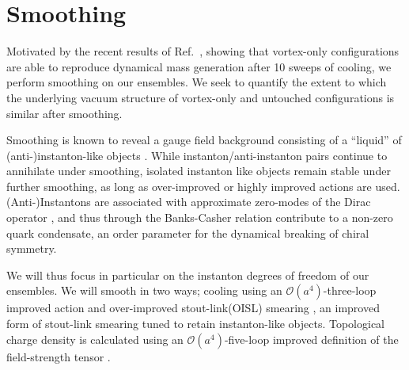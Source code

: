 \documentclass[
 reprint,
 amsmath,amssymb,
 aps,
prd,
]{revtex4-1}
\begin{document}
\section{Smoothing}
\label{sec:smoothing}

Motivated by the recent results of Ref.~\cite{Trewartha:2015nna}, showing that vortex-only configurations are able to reproduce dynamical mass generation after 10 sweeps of cooling, we perform smoothing on our ensembles. We seek to quantify the extent to which the underlying vacuum structure of vortex-only and untouched configurations is similar after smoothing.\par
Smoothing is known to reveal a gauge field background consisting of a ``liquid'' of (anti-)instanton-like objects \cite{Teper:1985rb,Ilgenfritz:1985dz}. While instanton/anti-instanton pairs continue to annihilate under smoothing, isolated instanton like objects remain stable under further smoothing, as long as over-improved or highly improved actions are used. (Anti-)Instantons are associated with approximate zero-modes of the Dirac operator \cite{Ilgenfritz:2008ia}, and thus through the Banks-Casher relation \cite{Banks:1979yr} contribute to a non-zero quark condensate, an order parameter for the dynamical breaking of chiral symmetry. \par
We will thus focus in particular on the instanton degrees of freedom of our ensembles. We will smooth in two ways; cooling \cite{Bonnet:2000dc,Bonnet:2001rc,Bonnet:2000db,BilsonThompson:2002jk,BilsonThompson:2004ez}  using an $\mathcal{O}(a^4)$-three-loop improved action \cite{Bonnet:2000db,BilsonThompson:2002jk} and over-improved stout-link(OISL) smearing \cite{Moran:2008qd,Moran:2008ra}, an improved form of stout-link smearing tuned to retain instanton-like objects. Topological charge density is calculated using an $\mathcal{O}(a^4)$-five-loop improved definition of the field-strength tensor \cite{BilsonThompson:2002jk}. \par
\end{document}
